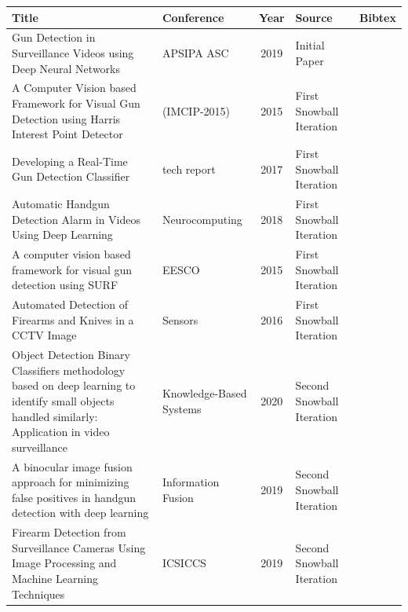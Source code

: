 
{ \scriptsize \begin{longtable}{|p{7.5cm}|p{2.5cm}|c|p{2cm}|p{2.2cm}|} %
		\hline
		Title & Conference & Year & Source & Bibtex\\
		\hline
		Gun Detection in Surveillance Videos using Deep Neural Networks & APSIPA ASC & 2019 & Initial Paper & \cite{lim2019gun0}\\
		\hline
		A Computer Vision based Framework for Visual Gun Detection using Harris Interest Point Detector & (IMCIP-2015) & 2015 & First Snowball Iteration & \cite{tiwari2015computer1}\\
		\hline
		Developing a Real-Time Gun Detection Classifier & tech report & 2017 & First Snowball Iteration & \cite{lai2017developing2}\\
		\hline
		Automatic Handgun Detection Alarm in Videos Using Deep Learning & Neurocomputing & 2018 & First Snowball Iteration & \cite{olmos2018automatic3}\\
		\hline
		A computer vision based framework for visual gun detection using SURF & EESCO & 2015 & First Snowball Iteration & \cite{tiwari2015computer4}\\
		\hline
		Automated Detection of Firearms and Knives in a CCTV Image & Sensors & 2016 & First Snowball Iteration & \cite{grega2016automated5}\\
		\hline
		Object Detection Binary Classifiers methodology based on deep learning to identify small objects handled similarly: Application in video surveillance & Knowledge-Based Systems & 2020 & Second Snowball Iteration & \cite{perez2020object6}\\
		\hline
		A binocular image fusion approach for minimizing false positives in handgun detection with deep learning & Information Fusion & 2019 & Second Snowball Iteration & \cite{olmos2019binocular7}\\
		\hline
		Firearm Detection from Surveillance Cameras Using Image Processing and Machine Learning Techniques & ICSICCS & 2019 & Second Snowball Iteration & \cite{gelana2019firearm8}\\

\end{longtable}}
